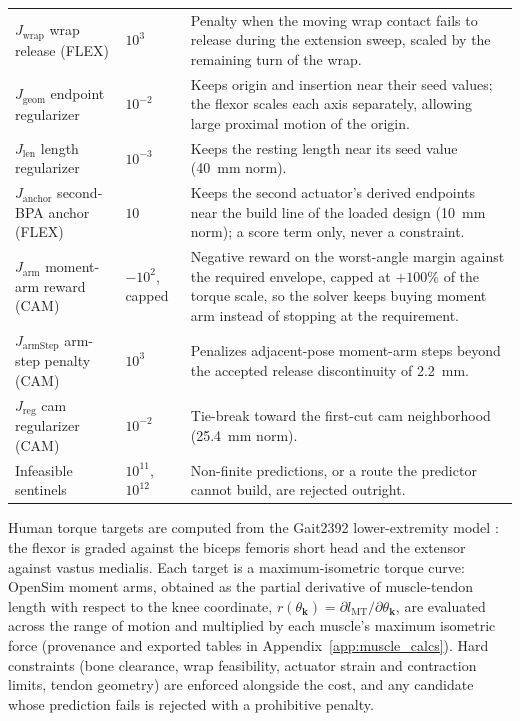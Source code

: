\begin{table}[htbp]
\begin{tabular}{@{}llp{8.2cm}@{}}
$J_{\text{wrap}}$ wrap release (FLEX) & $10^{3}$ & Penalty when the moving wrap contact fails to release during the extension sweep, scaled by the remaining turn of the wrap. \\
$J_{\text{geom}}$ endpoint regularizer & $10^{-2}$ & Keeps origin and insertion near their seed values; the flexor scales each axis separately, allowing large proximal motion of the origin. \\
$J_{\text{len}}$ length regularizer & $10^{-3}$ & Keeps the resting length near its seed value (40~mm norm). \\
$J_{\text{anchor}}$ second-BPA anchor (FLEX) & $10$ & Keeps the second actuator's derived endpoints near the build line of the loaded design (10~mm norm); a score term only, never a constraint. \\
$J_{\text{arm}}$ moment-arm reward (CAM) & $-10^{2}$, capped & Negative reward on the worst-angle margin against the required envelope, capped at $+100\%$ of the torque scale, so the solver keeps buying moment arm instead of stopping at the requirement. \\
$J_{\text{armStep}}$ arm-step penalty (CAM) & $10^{3}$ & Penalizes adjacent-pose moment-arm steps beyond the accepted release discontinuity of 2.2~mm. \\
$J_{\text{reg}}$ cam regularizer (CAM) & $10^{-2}$ & Tie-break toward the first-cut cam neighborhood (25.4~mm norm). \\
Infeasible sentinels & $10^{11}$, $10^{12}$ & Non-finite predictions, or a route the predictor cannot build, are rejected outright. \\
\bottomrule
\end{tabular}
\end{table}

Human torque targets are computed from the Gait2392 lower-extremity model \citep{delp_opensim_2007, seth_opensim_2018}: the flexor is graded against the biceps femoris short head and the extensor against vastus medialis. Each target is a maximum-isometric torque curve: OpenSim moment arms, obtained as the partial derivative of muscle-tendon length with respect to the knee coordinate, $r(\theta_{\mathbf{k}}) = \partial l_{\mathrm{MT}}/\partial\theta_{\mathbf{k}}$, are evaluated across the range of motion and multiplied by each muscle's maximum isometric force (provenance and exported tables in Appendix~\ref{app:muscle_calcs}). Hard constraints (bone clearance, wrap feasibility, actuator strain and contraction limits, tendon geometry) are enforced alongside the cost, and any candidate whose prediction fails is rejected with a prohibitive penalty.

